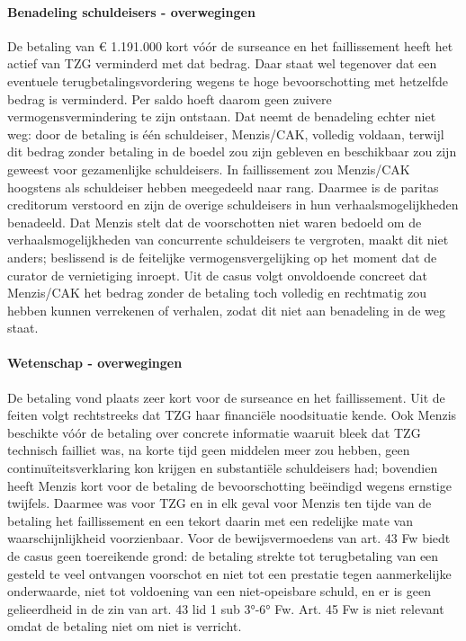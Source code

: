 \documentclass[
  dutch,
  a4paper,
]{article}
\begin{document}
\paragraph{Benadeling schuldeisers - overwegingen}\label{benadeling-schuldeisers---overwegingen-82}

De betaling van € 1.191.000 kort vóór de surseance en het faillissement heeft het actief van TZG verminderd met dat bedrag. Daar staat wel tegenover dat een eventuele terugbetalingsvordering wegens te hoge bevoorschotting met hetzelfde bedrag is verminderd. Per saldo hoeft daarom geen zuivere vermogensvermindering te zijn ontstaan. Dat neemt de benadeling echter niet weg: door de betaling is één schuldeiser, Menzis/CAK, volledig voldaan, terwijl dit bedrag zonder betaling in de boedel zou zijn gebleven en beschikbaar zou zijn geweest voor gezamenlijke schuldeisers. In faillissement zou Menzis/CAK hoogstens als schuldeiser hebben meegedeeld naar rang. Daarmee is de paritas creditorum verstoord en zijn de overige schuldeisers in hun verhaalsmogelijkheden benadeeld. Dat Menzis stelt dat de voorschotten niet waren bedoeld om de verhaalsmogelijkheden van concurrente schuldeisers te vergroten, maakt dit niet anders; beslissend is de feitelijke vermogensvergelijking op het moment dat de curator de vernietiging inroept. Uit de casus volgt onvoldoende concreet dat Menzis/CAK het bedrag zonder de betaling toch volledig en rechtmatig zou hebben kunnen verrekenen of verhalen, zodat dit niet aan benadeling in de weg staat.

\paragraph{Wetenschap - overwegingen}\label{wetenschap---overwegingen-82}

De betaling vond plaats zeer kort voor de surseance en het faillissement. Uit de feiten volgt rechtstreeks dat TZG haar financiële noodsituatie kende. Ook Menzis beschikte vóór de betaling over concrete informatie waaruit bleek dat TZG technisch failliet was, na korte tijd geen middelen meer zou hebben, geen continuïteitsverklaring kon krijgen en substantiële schuldeisers had; bovendien heeft Menzis kort voor de betaling de bevoorschotting beëindigd wegens ernstige twijfels. Daarmee was voor TZG en in elk geval voor Menzis ten tijde van de betaling het faillissement en een tekort daarin met een redelijke mate van waarschijnlijkheid voorzienbaar. Voor de bewijsvermoedens van art. 43 Fw biedt de casus geen toereikende grond: de betaling strekte tot terugbetaling van een gesteld te veel ontvangen voorschot en niet tot een prestatie tegen aanmerkelijke onderwaarde, niet tot voldoening van een niet-opeisbare schuld, en er is geen gelieerdheid in de zin van art. 43 lid 1 sub 3°-6° Fw. Art. 45 Fw is niet relevant omdat de betaling niet om niet is verricht.
\end{document}
